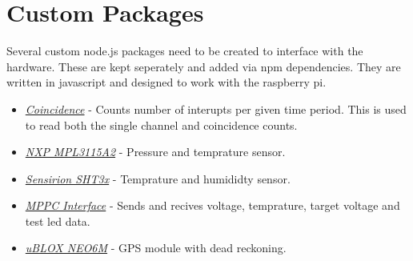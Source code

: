 \section{Custom Packages}
Several custom node.js packages need to be created to interface with the hardware. These are kept seperately and added via npm dependencies. They are written in javascript and designed to work with the raspberry pi. 

\begin{itemize}
  \item \href{https://github.com/muonTelescope/coincidence}{\emph{Coincidence}} - Counts number of interupts per given time period. This is used to read both the single channel and coincidence counts.
  \item \href{https://github.com/Sawaiz/mpl3115a2}{\emph{NXP MPL3115A2}} - Pressure and temprature sensor.
  \item \href{https://github.com/Sawaiz/sht3x}{\emph{Sensirion SHT3x}} - Temprature and humididty sensor.
  \item \href{https://github.com/muonTelescope/mppc-interface}{\emph{MPPC Interface}} - Sends and recives voltage, temprature, target voltage and test led data.
  \item \href{https://github.com/muonTelescope/neo6m}{\emph{uBLOX NEO6M}} - GPS module with dead reckoning.
\end{itemize}

